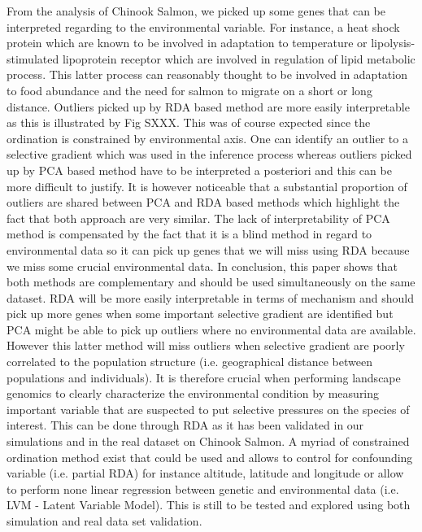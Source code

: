 \documentclass[nogrid]{MBE}%
\begin{document}
From the analysis of Chinook Salmon, we picked up some genes that can be interpreted regarding to the environmental variable. For instance, a heat shock protein which are known to be involved in adaptation to temperature or lipolysis-stimulated lipoprotein receptor which are involved in regulation of lipid metabolic process. This latter process can reasonably thought to be involved in adaptation to food abundance and the need for salmon to migrate on a short or long distance.
Outliers picked up by RDA based method are more easily interpretable as this is illustrated by Fig SXXX. This was of course expected since the ordination is constrained by environmental axis. One can identify an outlier to a selective gradient which was used in the inference process whereas outliers picked up by PCA based method have to be interpreted a posteriori and this can be more difficult to justify. It is however noticeable that a substantial proportion of outliers are shared between PCA and RDA based methods which highlight the fact that both approach are very similar. The lack of interpretability of PCA method is compensated by the fact that it is a blind method in regard to environmental data so it can pick up genes that we will miss using RDA because we miss some crucial environmental data. 
In conclusion, this paper shows that both methods are complementary and should be used simultaneously on the same dataset. RDA will be more easily interpretable in terms of mechanism and should pick up more genes when some important selective gradient are identified but PCA might be able to pick up outliers where no environmental data are available. However this latter method will miss outliers when selective gradient are poorly correlated to the population structure (i.e. geographical distance between populations and individuals). It is therefore crucial when performing landscape genomics to clearly characterize the environmental condition by measuring important variable that are suspected to put selective pressures on the species of interest. This can be done through RDA as it has been validated in our simulations and in the real dataset on Chinook Salmon. 
A myriad of constrained ordination method exist that could be used and allows to control for confounding variable (i.e. partial RDA) for instance altitude, latitude and longitude or allow to perform none linear regression between genetic and environmental data (i.e. LVM - Latent Variable Model). This is still to be tested and explored using both simulation and real data set validation.
\end{document}
